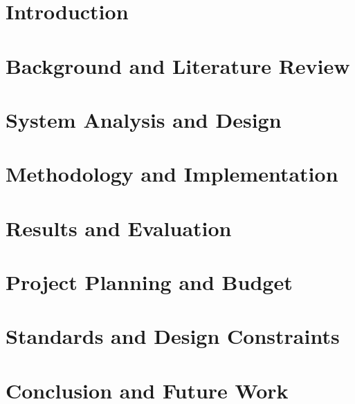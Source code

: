 \documentclass[12pt]{report}
\newif\iffastcompile
\begin{document}
\renewcommand{\thepage}{\roman{page}}







\tableofcontents
\iffastcompile\else
{}
\listoffigures
{}
\listoftables
\fi

\clearpage
\setcounter{page}{1}
\renewcommand{\thepage}{\arabic{page}}

\chapter{Introduction}\label{cha:introduction}


\chapter{Background and Literature Review}\label{cha:LiteratureReviewU}


\chapter{System Analysis and Design}\label{cha:SystemAnalysisAndDesignU}


\chapter{Methodology and Implementation}\label{cha:MethodologyAndImplementationU}


\chapter{Results and Evaluation}\label{cha:ResultsAndEvaluationU}


\chapter{Project Planning and Budget}\label{cha:cost_time}


\chapter{Standards and Design Constraints}\label{cha:AccreditationComponents}


\chapter{Conclusion and Future Work}\label{cha:ConclusionAndFutureWork}





\appendix

\end{document}
